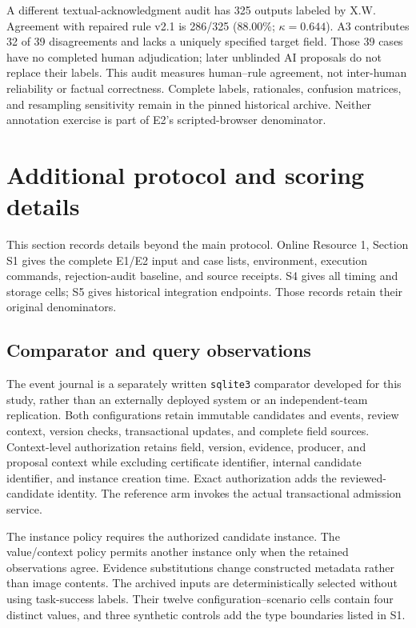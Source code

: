 \documentclass[11pt,a4paper]{article}
\newcommand{\code}[1]{\nolinkurl{#1}}
\begin{document}
A different textual-acknowledgment audit has 325 outputs labeled by X.W. Agreement with repaired rule v2.1 is 286/325 (88.00\%; $\kappa=0.644$). A3 contributes 32 of 39 disagreements and lacks a uniquely specified target field. Those 39 cases have no completed human adjudication; later unblinded AI proposals do not replace their labels. This audit measures human--rule agreement, not inter-human reliability or factual correctness. Complete labels, rationales, confusion matrices, and resampling sensitivity remain in the pinned historical archive. Neither annotation exercise is part of E2's scripted-browser denominator.

\section{Additional protocol and scoring details}
\label{app:detailed-protocol}

This section records details beyond the main protocol. Online Resource 1, Section S1 gives the complete E1/E2 input and case lists, environment, execution commands, rejection-audit baseline, and source receipts. S4 gives all timing and storage cells; S5 gives historical integration endpoints. Those records retain their original denominators.

\subsection{Comparator and query observations}

The event journal is a separately written \code{sqlite3} comparator developed for this study, rather than an externally deployed system or an independent-team replication. Both configurations retain immutable candidates and events, review context, version checks, transactional updates, and complete field sources. Context-level authorization retains field, version, evidence, producer, and proposal context while excluding certificate identifier, internal candidate identifier, and instance creation time. Exact authorization adds the reviewed-candidate identity. The reference arm invokes the actual transactional admission service.

The instance policy requires the authorized candidate instance. The value/context policy permits another instance only when the retained observations agree. Evidence substitutions change constructed metadata rather than image contents. The archived inputs are deterministically selected without using task-success labels. Their twelve configuration--scenario cells contain four distinct values, and three synthetic controls add the type boundaries listed in S1.
\end{document}
